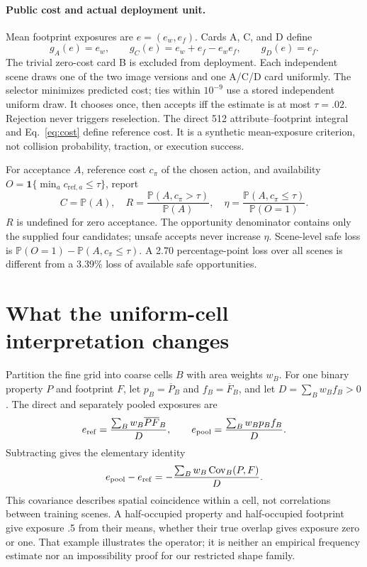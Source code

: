 \documentclass{article}
\newcommand{\Prb}{\mathbb{P}}
\newcommand{\ind}{\mathbf{1}}
\begin{document}
\paragraph{Public cost and actual deployment unit.}
Mean footprint exposures are $ e=(e_w,e_f)$. Cards A, C, and D define
\begin{equation}
g_A(e)=e_w,\qquad g_C(e)=e_w+e_f-e_we_f,\qquad g_D(e)=e_f.
\label{eq:cost}
\end{equation}
The trivial zero-cost card B is excluded from deployment. Each independent scene
draws one of the two image versions and one A/C/D card uniformly. The selector
minimizes predicted cost; ties within $10^{-9}$ use a stored independent uniform
draw. It chooses once, then accepts iff the estimate is at most $\tau=.02$.
Rejection never triggers reselection. The direct 512 attribute--footprint integral
and Eq.~\ref{eq:cost} define reference cost. It is a synthetic mean-exposure
criterion, not collision probability, traction, or execution success.

For acceptance $A$, reference cost $ c_\pi $ of the chosen action, and availability
$O=\ind\{\min_a c_{\mathrm{ref},a}\leq\tau\}$, report
\begin{equation}
C=\Prb(A),\quad R=\frac{\Prb(A,c_\pi>\tau)}{\Prb(A)},\quad
\eta=\frac{\Prb(A,c_\pi\leq\tau)}{\Prb(O=1)}.
\label{eq:metrics}
\end{equation}
$R$ is undefined for zero acceptance. The opportunity denominator contains only
the supplied four candidates; unsafe accepts never increase $\eta $. Scene-level
safe loss is $\Prb(O=1)-\Prb(A,c_\pi\leq\tau)$. A 2.70 percentage-point loss
over all scenes is different from a 3.39\% loss of available safe opportunities.

\section{What the uniform-cell interpretation changes}
\label{sec:mechanism}
Partition the fine grid into coarse cells $B$ with area weights $ w_B$. For one
binary property $P$ and footprint $F$, let $ p_B=\overline P_B$ and
$ f_B=\overline F_B$, and let $D=\sum_B w_B f_B>0$. The direct and separately
pooled exposures are
\begin{equation}
e_{\rm ref}=\frac{\sum_Bw_B\overline{PF}_B}{D},\qquad
e_{\rm pool}=\frac{\sum_Bw_Bp_Bf_B}{D}.
\end{equation}
Subtracting gives the elementary identity
\begin{equation}
e_{\rm pool}-e_{\rm ref}
=-\frac{\sum_Bw_B\operatorname{Cov}_B(P,F)}{D}.
\label{eq:covariance}
\end{equation}
This covariance describes spatial coincidence within a cell, not correlations
between training scenes. A half-occupied property and half-occupied footprint
give exposure .5 from their means, whether their true overlap gives exposure
zero or one. That example illustrates the operator; it is neither an empirical
frequency estimate nor an impossibility proof for our restricted shape family.
\end{document}
